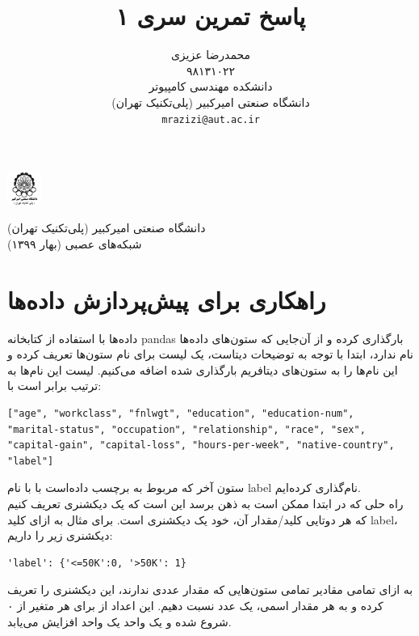 \documentclass{article}
\title{پاسخ تمرین سری ۱ }
\author{%
  محمدرضا عزیزی\\
  ۹۸۱۳۱۰۲۲ \\
  دانشکده مهندسی کامپیوتر\\
  دانشگاه صنعتی امیرکبیر (پلی‌تکنیک تهران)\\
  \texttt{mrazizi@aut.ac.ir} \\
}
\begin{document}
\begin{minipage}{0.1\textwidth}%
\includegraphics[width=1.1cm]{aut_logo.png}
\end{minipage}%
\hfill%
\begin{minipage}{0.9\textwidth}\raggedleft
دانشگاه صنعتی امیرکبیر (پلی‌تکنیک تهران)\\
شبکه‌های عصبی (بهار ۱۳۹۹)\\
\end{minipage}


\makepertitle




\section{
راهکاری برای پیش‌پردازش داده‌ها
}

داده‌ها با استفاده از کتابخانه pandas بارگذاری کرده و از آن‌جایی که ستون‌های داده‌ها نام ندارد، ابتدا با توجه به توضیحات دیتاست، یک لیست برای نام ستون‌ها تعریف کرده و این نام‌ها را به ستون‌های دیتافریم بارگذاری شده اضافه می‌کنیم. لیست این نام‌ها به ترتیب برابر است با:

\begin{latin}
\begin{lstlisting}
["age", "workclass", "fnlwgt", "education", "education-num", 
"marital-status", "occupation", "relationship", "race", "sex", 
"capital-gain", "capital-loss", "hours-per-week", "native-country", "label"]
\end{lstlisting}
\end{latin}

ستون آخر که مربوط به برچسب داده‌است با با نام label نام‌گذاری کرده‌ایم. \\

راه حلی که در ابتدا ممکن است به ذهن برسد این است که یک دیکشنری تعریف کنیم که هر دوتایی کلید/مقدار آن، خود یک دیکشنری است. برای مثال به ازای کلید label، دیکشنری زیر را داریم:

\begin{latin}
\begin{lstlisting}
'label': {'<=50K':0, '>50K': 1}
\end{lstlisting}
\end{latin}

به ازای تمامی مقادیر تمامی ستون‌هایی که مقدار عددی ندارند، این دیکشنری را تعریف کرده و به هر مقدار اسمی، یک عدد نسبت دهیم. این اعداد از برای هر متغیر از ۰ شروع شده و یک واحد یک واحد افزایش می‌یابد. 
\end{document}
